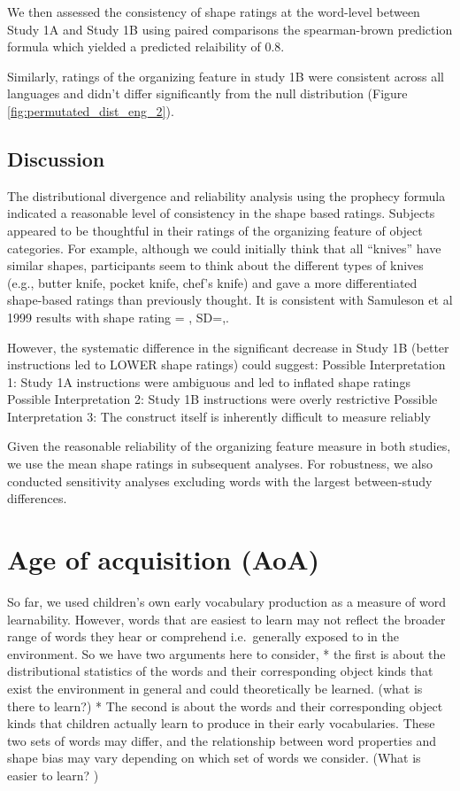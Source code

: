 \documentclass[
  english,
  man]{apa6}
\begin{document}
We then assessed the consistency of shape ratings at the word-level between Study 1A and Study 1B using paired comparisons the spearman-brown prediction formula which yielded a predicted relaibility of 0.8.

Similarly, ratings of the organizing feature in study 1B were consistent across all languages and didn't differ significantly from the null distribution (Figure \ref{fig:permutated_dist_eng_2}).

\subsection{Discussion}\label{discussion-1}

The distributional divergence and reliability analysis using the prophecy formula indicated a reasonable level of consistency in the shape based ratings. Subjects appeared to be thoughtful in their ratings of the organizing feature of object categories. For example, although we could initially think that all ``knives'' have similar shapes, participants seem to think about the different types of knives (e.g., butter knife, pocket knife, chef's knife) and gave a more differentiated shape-based ratings than previously thought. It is consistent with Samuleson et al 1999 results with shape rating = , SD=,.

However, the systematic difference in the significant decrease in Study 1B (better instructions led to LOWER shape ratings) could suggest:
Possible Interpretation 1: Study 1A instructions were ambiguous and led to inflated shape ratings
Possible Interpretation 2: Study 1B instructions were overly restrictive
Possible Interpretation 3: The construct itself is inherently difficult to measure reliably

Given the reasonable reliability of the organizing feature measure in both studies, we use the mean shape ratings in subsequent analyses. For robustness, we also conducted sensitivity analyses excluding words with the largest between-study differences.

\section{Age of acquisition (AoA)}\label{age-of-acquisition-aoa}

So far, we used children's own early vocabulary production as a measure of word learnability. However, words that are easiest to learn may not reflect the broader range of words they hear or comprehend i.e.~generally exposed to in the environment. So we have two arguments here to consider,
* the first is about the distributional statistics of the words and their corresponding object kinds that exist the environment in general and could theoretically be learned. (what is there to learn?)
* The second is about the words and their corresponding object kinds that children actually learn to produce in their early vocabularies. These two sets of words may differ, and the relationship between word properties and shape bias may vary depending on which set of words we consider. (What is easier to learn? )
\end{document}
